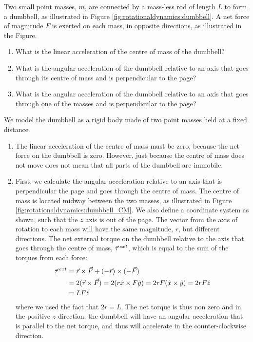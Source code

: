 \begin{example}{ Two small point masses, $m$, are connected by a mass-less rod of length $L$ to form a dumbbell, as illustrated in Figure \ref{fig:rotationaldynamics:dumbbell}. A net force of magnitude $F$ is exerted on each mass, in opposite directions, as illustrated in the Figure. 
\begin{enumerate}[label=\alph*),topsep=-10pt]
\item What is the linear acceleration of the centre of mass of the dumbbell?
\item What is the angular acceleration of the dumbbell relative to an axis that goes through its centre of mass and is perpendicular to the page?
\item What is the angular acceleration of the dumbbell relative to an axis that goes through one of the masses and is perpendicular to the page? 
\end{enumerate}}

We model the dumbbell as a rigid body made of two point masses held at a fixed distance.
\begin{enumerate}[label=\alph*),topsep=-10pt]
\item The linear acceleration of the centre of mass must be zero, because the net force on the dumbbell is zero. However, just because the centre of mass does not move does not mean that all parts of the dumbbell are immobile.

\item First, we calculate the angular acceleration relative to an axis that is perpendicular the page and goes through the centre of mass. The centre of mass is located midway between the two masses, as illustrated in Figure \ref{fig:rotationaldynamics:dumbbell_CM}. We also define a coordinate system as shown, such that the $z$ axis is out of the page.
The vector from the axis of rotation to each mass will have the same magnitude, $r$, but different directions. The net external torque on the dumbbell relative to the axis that goes through the centre of mass, $\pvec\tau^{ext}$, which is equal to the sum of the torques from each force:
\begin{align*}
\pvec\tau^{ext}&= \vec r \times \vec F + (-\vec r) \times (-\vec F) \\
&= 2 (\vec r \times \vec F)=2 (r\hat x \times F\hat y) = 2rF (\hat x \times \hat y)=2rF\hat z\\
&=LF\hat z
\end{align*}
where we used the fact that $2r = L$. The net torque is thus non zero and in the positive $z$ direction; the dumbbell will have an angular acceleration that is parallel to the net torque, and thus will accelerate in the counter-clockwise direction.


\end{enumerate}
\end{example}
